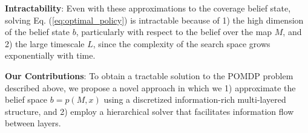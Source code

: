 \documentclass{article}
\newcommand{\ph}[1]{{\textbf{#1}:}} %
\begin{document}
\ph{Intractability} 
Even with these approximations to the coverage belief state, solving Eq. (\ref{eq:optimal_policy}) is intractable because of 1) the high dimension of the belief state $b$, particularly with respect to the belief over the map $M$, and 2) the large timescale $L$, since the complexity of the search space grows exponentially with time.

\ph{Our Contributions} 
To obtain a tractable solution to the POMDP problem described above, we propose a novel approach in which we 1) approximate the belief space $b=p(M,x)$ using a discretized information-rich multi-layered structure, and 2) employ a hierarchical solver that facilitates information flow between layers. 




























\end{document}
